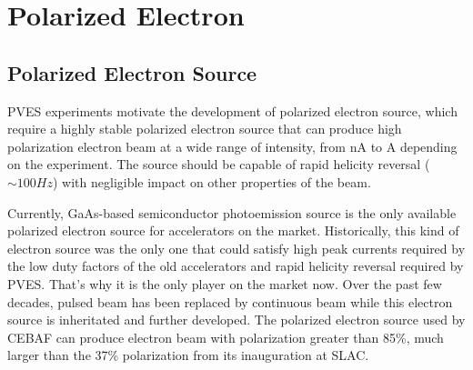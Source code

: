 \section{Polarized Electron}

\subsection{Polarized Electron Source}
PVES experiments motivate the development of polarized electron source, which 
require a highly stable polarized electron source that can produce
high polarization electron beam at a wide range of intensity, from nA to A 
depending on the experiment. The source should be capable of rapid helicity
reversal ($\sim 100 Hz$) with negligible impact on other properties of the beam.

Currently, GaAs-based semiconductor photoemission source is %
the only available polarized electron source for accelerators on the market.
Historically, this 
kind of electron source was the only one that could satisfy high peak currents 
required by the low duty factors of the old accelerators and rapid helicity 
reversal required by PVES. That's why it is the only player on the market now.
Over the past few decades, pulsed beam has been replaced by continuous beam while
this electron source is inheritated and further developed. The polarized electron
source used by CEBAF can produce electron beam with polarization greater than
85\%, much larger than the 37\% polarization from its inauguration at SLAC. \cite{PRESCOTT1978347}

